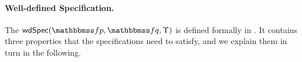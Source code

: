 
\paragraph{\textbf{Well-defined Specification.}}
The $\wdSpec{\relspecpre}{\relspecpost}{\hprim}$
is defined formally in
\Def{\ref{def:well-defined specification}}.
It contains three properties that
the specifications need to satisfy,
and we explain them in turn in the following.

